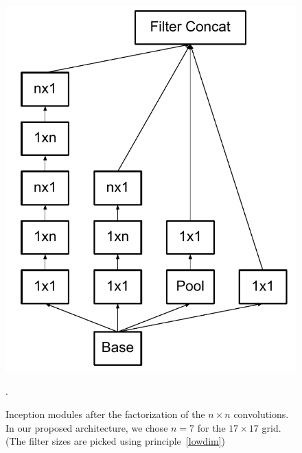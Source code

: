 \begin{figure}
\centering
\includegraphics[width=\linewidth]{inceptionv3}
\caption{Inception modules after the factorization of the $n\times n$
convolutions. In our proposed architecture, we chose $n=7$ for the
$17\times 17$ grid. (The filter sizes are picked using principle~\ref{lowdim})}.
\label{fig:inceptionv3}
\end{figure}
